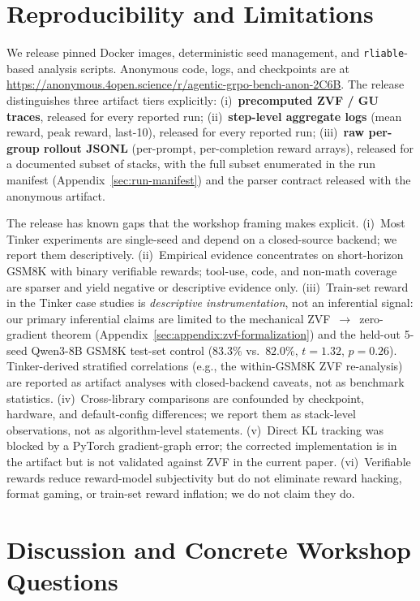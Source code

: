 \documentclass{article}
\begin{document}
\section{Reproducibility and Limitations}
\label{sec:limitations}


We release pinned Docker images, deterministic seed management, and
\texttt{rliable}-based analysis scripts. Anonymous code, logs, and
checkpoints are at
\url{https://anonymous.4open.science/r/agentic-grpo-bench-anon-2C6B}.
The release distinguishes three artifact tiers explicitly:
(i)~\textbf{precomputed ZVF / GU traces}, released for every reported run;
(ii)~\textbf{step-level aggregate logs} (mean reward, peak reward,
last-10), released for every reported run;
(iii)~\textbf{raw per-group rollout JSONL} (per-prompt, per-completion
reward arrays), released for a documented subset of stacks, with the full
subset enumerated in the run manifest (Appendix~\ref{sec:run-manifest})
and the parser contract released with the anonymous artifact.

The release has known gaps that the workshop framing makes explicit. (i)~Most
Tinker experiments are single-seed and depend on a closed-source backend; we
report them descriptively. (ii)~Empirical evidence concentrates on
short-horizon GSM8K with binary verifiable rewards; tool-use, code, and
non-math coverage are sparser and yield negative or descriptive evidence
only. (iii)~Train-set reward in the Tinker case studies is \emph{descriptive
instrumentation}, not an inferential signal: our primary inferential claims
are limited to the mechanical ZVF~$\to$~zero-gradient theorem
(Appendix~\ref{sec:appendix:zvf-formalization}) and the held-out 5-seed Qwen3-8B
GSM8K test-set control ($83.3\%$ vs.\ $82.0\%$, $t{=}1.32$, $p{=}0.26$).
Tinker-derived stratified correlations (e.g., the within-GSM8K ZVF
re-analysis) are reported as artifact analyses with closed-backend caveats,
not as benchmark statistics. (iv)~Cross-library comparisons are confounded by
checkpoint, hardware, and default-config differences; we report them as
stack-level observations, not as algorithm-level statements. (v)~Direct KL
tracking was blocked by a PyTorch gradient-graph error; the corrected
implementation is in the artifact but is not validated against ZVF in the
current paper. (vi)~Verifiable rewards reduce reward-model subjectivity but
do not eliminate reward hacking, format gaming, or train-set reward
inflation; we do not claim they do.

\section{Discussion and Concrete Workshop Questions}
\label{sec:conclusion}
\end{document}
